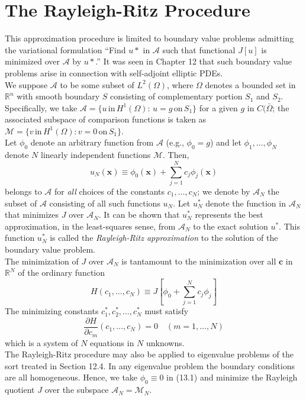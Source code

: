 \documentclass[11pt]{book}
\theoremstyle{example}
\theoremstyle{problem}
\theoremstyle{theorem}
\theoremstyle{definition}
\begin{document}
\section{The Rayleigh-Ritz Procedure}
This approximation procedure is limited to boundary value problems admitting the variational formulation ``Find $u*$ in $\mathscr{A}$ such that functional $J[u]$ is minimized over $\mathscr{A}$ by $u*$.'' It was seen in Chapter 12 that such boundary value problems arise in connection with self-adjoint elliptic PDEs.\\
We suppose $\mathscr{A}$ to be some subset of $L^2(\Omega)$, where $\Omega$ denotes a bounded set in $\mathbb{R}^n$ with smooth boundary $S$ consisting of complementary portion $S_1$ and $S_2$. Specifically, we take $\mathscr{A}=\{u\,\mathrm{in}\,H^1(\Omega):\,u=g\,\mathrm{on}\,S_1\}$ for a given $g$ in $C(\bar{\Omega}$; the associated subspace of comparison functions is taken as $\mathscr{M}=\{v\,\mathrm{in}\,H^1(\Omega):v=0\,\mathrm{on}\,S_1\}$.\\
Let $\phi_0$ denote an arbitrary function from $\mathscr{A}$ (e.g., $\phi_0=g$) and let $\phi_1,\dots,\phi_N$ denote $N$ linearly independent functions $\mathscr{M}$. Then,
\begin{equation}
	u_N(\mathbf{x})\equiv\phi_0(\mathbf{x})+\sum_{j=1}^N{c_j\phi_j(\mathbf{x})}
\end{equation}
belongs to $\mathscr{A}$ for \emph{all} choices of the constants $c_1,\dots,c_N$; we denote by $\mathscr{A}_N$ the subset of $\mathscr{A}$ consisting of all such functions $u_N$. Let $u_N^*$ denote the function in $\mathscr{A}_N$ that minimizes $J$ over $\mathscr{A}_N$. It can be shown that $u_N^*$ represents the best approximation, in the least-squares sense, from $\mathscr{A}_N$ to the exact solution $u^*$. This function $u_N^*$ is called the \emph{Rayleigh-Ritz approximation} to the solution of the boundary value problem.\\
The minimization of $J$ over $\mathscr{A}_N$ is tantamount to the minimization over all $\mathbf{c}$ in $\mathbb{R}^N$ of the ordinary function
\begin{equation}
	H(c_1,\dots,c_N){\equiv}J\left[\phi_0+\sum_{j=1}^N{c_j\phi_j}\right]
\end{equation}
The minimizing constants $c_1^*,c_2^*,\dots,c_N^*$ must satisfy
\begin{equation}
	\frac{{\partial}H}{{\partial}c_m}(c_1,\dots,c_N)=0\quad(m=1,\dots,N)
\end{equation}
which is a system of $N$ equations in $N$ unknowns.\\
The Rayleigh-Ritz procedure may also be applied to eigenvalue problems of the sort treated in Section 12.4. In any eigenvalue problem the boundary conditions are all homogeneous. Hence, we take $\phi_0{\equiv}0$ in (13.1) and minimize the Rayleigh quotient $J$ over the subspace $\mathscr{A}_N=\mathscr{M}_N$.
\end{document}
